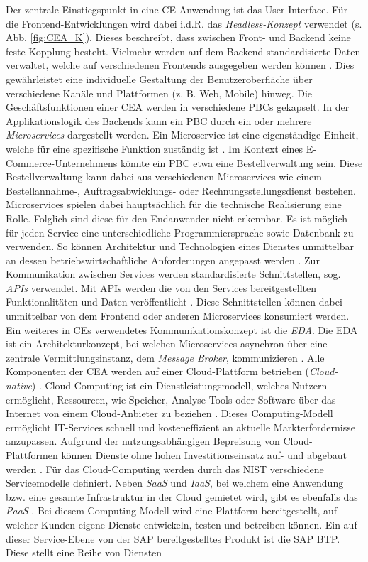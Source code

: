 Der zentrale Einstiegspunkt in eine CE-Anwendung ist das User-Interface. Für die Frontend-Entwicklungen wird dabei i.d.R. das \textit{Headless-Konzept} verwendet (s. Abb. \ref{fig:CEA_K}). Dieses beschreibt, dass zwischen Front- und Backend keine feste Kopplung besteht. Vielmehr werden auf dem Backend standardisierte Daten verwaltet, welche auf verschiedenen Frontends ausgegeben werden können \cite[4]{Attardi.2020b}. Dies gewährleistet eine individuelle Gestaltung der Benutzeroberfläche über verschiedene Kanäle und Plattformen (z. B. Web, Mobile) hinweg. Die Geschäftsfunktionen einer CEA werden in verschiedene PBCs gekapselt. In der Applikationslogik des Backends kann ein PBC durch ein oder mehrere \textit{Microservices} dargestellt werden. Ein Microservice ist eine eigenständige Einheit, welche für eine spezifische Funktion zuständig ist \cite[S. 93 ff.]{Lauretis.1027201910302019}. Im Kontext eines E-Commerce-Unternehmens könnte ein PBC etwa eine Bestellverwaltung sein. Diese Bestellverwaltung kann dabei aus verschiedenen Microservices wie einem Bestellannahme-, Auftragsabwicklungs- oder Rechnungsstellungsdienst bestehen. Microservices spielen dabei hauptsächlich für die technische Realisierung eine Rolle. Folglich sind diese für den Endanwender nicht erkennbar. Es ist möglich für jeden Service eine unterschiedliche Programmiersprache sowie Datenbank zu verwenden. So können Architektur und Technologien eines Dienstes unmittelbar an dessen betriebswirtschaftliche Anforderungen angepasst werden \cite[42]{Balalaie.2016}. Zur Kommunikation zwischen Services werden standardisierte Schnittstellen, sog. \textit{\ac*{APIs}} verwendet. Mit APIs werden die von den Services bereitgestellten Funktionalitäten und Daten veröffentlicht \cite[15]{Biehl.2015}. Diese Schnittstellen können dabei unmittelbar von dem Frontend oder anderen Microservices konsumiert werden. Ein weiteres in CEs verwendetes Kommunikationskonzept ist die \textit{\ac{EDA}}. Die EDA ist ein Architekturkonzept, bei welchen Microservices asynchron über eine zentrale Vermittlungsinstanz, dem \textit{Message Broker}, kommunizieren \cite[54]{Bruns.2010}. Alle Komponenten der CEA werden auf einer Cloud-Plattform betrieben (\textit{Cloud-native}) \cite[3]{Kratzke.2017}. Cloud-Computing ist ein Dienstleistungsmodell, welches Nutzern ermöglicht, Ressourcen, wie Speicher, Analyse-Tools oder Software über das Internet von einem Cloud-Anbieter zu beziehen \cite[5]{Reinheimer.2018}. Dieses Computing-Modell ermöglicht IT-Services schnell und kosteneffizient an aktuelle Markterfordernisse anzupassen. Aufgrund der nutzungsabhängigen Bepreisung von Cloud-Plattformen können Dienste ohne hohen Investitionseinsatz auf- und abgebaut werden \cite[10]{Reinheimer.2018}. Für das Cloud-Computing werden durch das \ac{NIST} verschiedene Servicemodelle definiert. Neben \textit{\ac{SaaS}} und \textit{\ac{IaaS}}, bei welchem eine Anwendung bzw. eine gesamte Infrastruktur in der Cloud gemietet wird, gibt es ebenfalls das \textit{\ac{PaaS}} \cite{Reinheimer.2018} \cite[9]{Reinheimer.2018}. Bei diesem Computing-Modell wird eine Plattform bereitgestellt, auf welcher Kunden eigene Dienste entwickeln, testen und betreiben können. Ein auf dieser Service-Ebene von der SAP bereitgestelltes Produkt ist die \ac{SAP BTP}. Diese stellt eine Reihe von Diensten 